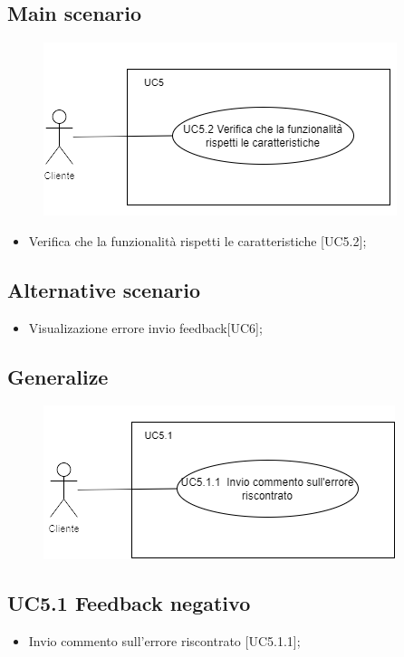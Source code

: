\documentclass{article}
\begin{document}
    \subsection*{Main scenario}
        \begin{figure}[h]
            \centering
            \includegraphics{./imgUML/UC5-zoom.png}
            \label{fig:immagine}
        \end{figure}
        \begin{itemize}
            \item Verifica che la funzionalità rispetti le caratteristiche [UC5.2];
        \end{itemize}
        
    \subsection*{Alternative scenario}
    \begin{itemize}
        \item Visualizazione errore invio feedback[UC6];
    \end{itemize}

    \subsection*{Generalize}
    \begin{figure}[h]
            \centering
            \includegraphics{./imgUML/UC5-zoom1.png}
            \label{fig:immagine}
        \end{figure}
    \subsection{UC5.1 Feedback negativo}
    \begin{itemize}
            \item Invio commento sull'errore riscontrato [UC5.1.1];
        \end{itemize}
        
\end{document}

